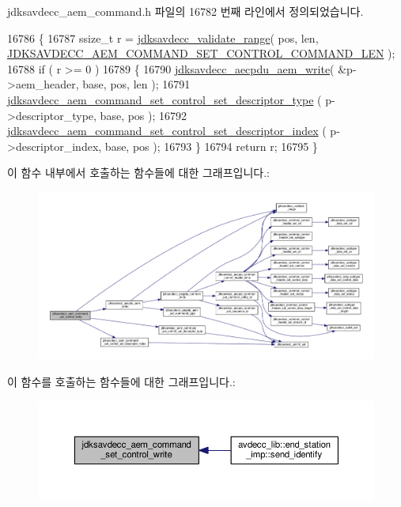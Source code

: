 jdksavdecc\+\_\+aem\+\_\+command.\+h 파일의 16782 번째 라인에서 정의되었습니다.


\begin{DoxyCode}
16786 \{
16787     ssize\_t r = \hyperlink{group__util_ga9c02bdfe76c69163647c3196db7a73a1}{jdksavdecc\_validate\_range}( pos, len, 
      \hyperlink{group__command__set__control_ga500832fc15eb493007a81a9d07ab06e5}{JDKSAVDECC\_AEM\_COMMAND\_SET\_CONTROL\_COMMAND\_LEN} );
16788     \textcolor{keywordflow}{if} ( r >= 0 )
16789     \{
16790         \hyperlink{group__aecpdu__aem_gad658e55771cce77cecf7aae91e1dcbc5}{jdksavdecc\_aecpdu\_aem\_write}( &p->aem\_header, base, pos, len );
16791         \hyperlink{group__command__set__control_gaa66eb8eb9dcc6d5a97040a225538bea0}{jdksavdecc\_aem\_command\_set\_control\_set\_descriptor\_type}
      ( p->descriptor\_type, base, pos );
16792         \hyperlink{group__command__set__control_ga4ec3825da6eb948fa7369f822b4d317f}{jdksavdecc\_aem\_command\_set\_control\_set\_descriptor\_index}
      ( p->descriptor\_index, base, pos );
16793     \}
16794     \textcolor{keywordflow}{return} r;
16795 \}
\end{DoxyCode}


이 함수 내부에서 호출하는 함수들에 대한 그래프입니다.\+:
\nopagebreak
\begin{figure}[H]
\begin{center}
\leavevmode
\includegraphics[width=350pt]{group__command__set__control_ga0b8a1dcd8867aa3cf2d0f68f300a4f65_cgraph}
\end{center}
\end{figure}




이 함수를 호출하는 함수들에 대한 그래프입니다.\+:
\nopagebreak
\begin{figure}[H]
\begin{center}
\leavevmode
\includegraphics[width=350pt]{group__command__set__control_ga0b8a1dcd8867aa3cf2d0f68f300a4f65_icgraph}
\end{center}
\end{figure}



